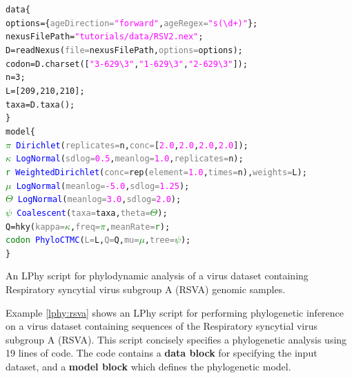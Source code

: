 \documentclass[12pt]{article} %
\begin{document}
{
  \small
  \begin{listing}
    \begin{alltt}
    data \{
      options = \{\textcolor{gray}{ageDirection=}\textcolor{magenta}{"forward"}, \textcolor{gray}{ageRegex=}\textcolor{magenta}{"s(\textbackslash{}d+)"}\};
      nexusFilePath = \textcolor{magenta}{"tutorials/data/RSV2.nex"};
      D = \textcolor{magenta!80!black}{readNexus}(\textcolor{gray}{file=}nexusFilePath, \textcolor{gray}{options=}options);
      codon = D.\textcolor{magenta!80!black}{charset}([\textcolor{magenta}{"3-629\textbackslash{}3"}, \textcolor{magenta}{"1-629\textbackslash{}3"}, \textcolor{magenta}{"2-629\textbackslash{}3"}]);
      n = 3;
      L = [209, 210, 210];
      taxa = D.\textcolor{magenta!80!black}{taxa}();
    \}
    model \{
      \textcolor{green}{\(\pi\)} ~ \textcolor{blue}{Dirichlet}(\textcolor{gray}{replicates=}n, \textcolor{gray}{conc=}[\textcolor{magenta}{2.0}, \textcolor{magenta}{2.0}, \textcolor{magenta}{2.0}, \textcolor{magenta}{2.0}]);
      \textcolor{green}{\(\kappa\)} ~ \textcolor{blue}{LogNormal}(\textcolor{gray}{sdlog=}\textcolor{magenta}{0.5}, \textcolor{gray}{meanlog=}\textcolor{magenta}{1.0}, \textcolor{gray}{replicates=}n);
      \textcolor{green}{r} ~ \textcolor{blue}{WeightedDirichlet}(\textcolor{gray}{conc=}\textcolor{magenta!80!black}{rep}(\textcolor{gray}{element=}\textcolor{magenta}{1.0}, \textcolor{gray}{times=}n), \textcolor{gray}{weights=}L);
      \textcolor{green}{\(\mu\)} ~ \textcolor{blue}{LogNormal}(\textcolor{gray}{meanlog=}\textcolor{magenta}{-5.0}, \textcolor{gray}{sdlog=}\textcolor{magenta}{1.25});
      \textcolor{green}{\(\Theta\)} ~ \textcolor{blue}{LogNormal}(\textcolor{gray}{meanlog=}\textcolor{magenta}{3.0}, \textcolor{gray}{sdlog=}\textcolor{magenta}{2.0});
      \textcolor{green}{\(\psi\)} ~ \textcolor{blue}{Coalescent}(\textcolor{gray}{taxa=}taxa, \textcolor{gray}{theta=}\textcolor{green}{\(\Theta\)});
      Q = \textcolor{magenta!80!black}{hky}(\textcolor{gray}{kappa=}\textcolor{green}{\(\kappa\)}, \textcolor{gray}{freq=}\textcolor{green}{\(\pi\)}, \textcolor{gray}{meanRate=}\textcolor{green}{r});
      \textcolor{green}{codon} ~ \textcolor{blue}{PhyloCTMC}(\textcolor{gray}{L=}L, \textcolor{gray}{Q=}Q, \textcolor{gray}{mu=}\textcolor{green}{\(\mu\)}, \textcolor{gray}{tree=}\textcolor{green}{\(\psi\)});
    \}
    \end{alltt}
    \caption{An LPhy script for phylodynamic analysis of a virus dataset containing Respiratory syncytial virus subgroup A (RSVA) genomic samples.
    \newline}
    \label{lphy:rsva}
    \end{listing}
}
Example \ref{lphy:rsva} shows an LPhy script for performing phylogenetic inference on a virus dataset containing sequences of the Respiratory syncytial virus subgroup A (RSVA). 
This script concisely specifies a phylogenetic analysis using 19 lines of code.  
The code contains a \textbf{data block} for specifying the input dataset, and a \textbf{model block} which defines the phylogenetic model. 
\end{document}
